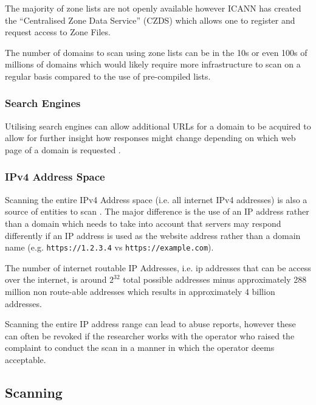\documentclass{mscreport}
\begin{document}
\vspace{0.3cm} \noindent
The majority of zone lists are not openly available however ICANN has created the ``Centralised Zone Data Service'' (CZDS) \cite{noauthor_undated-mm} which allows one to register and request access to Zone Files.

\vspace{0.3cm} \noindent
The number of domains to scan using zone lists can be in the 10s or even 100s of millions of domains which would likely require more infrastructure to scan on a regular basis compared to the use of pre-compiled lists.

\subsubsection{Search Engines}

Utilising search engines can allow additional URLs for a domain to be acquired to allow for further insight how responses might change depending on which web page of a domain is requested \cite{Chen2016-dl}.

\subsubsection{IPv4 Address Space}

Scanning the entire IPv4 Address space (i.e. all internet  IPv4 addresses) is also a source of entities to scan \cite{Kotzias2018-wd}. The major difference is the use of an IP address rather than a domain which needs to take into account that servers may respond differently if an IP address is used as the website address rather than a domain name (e.g. \texttt{https://1.2.3.4} vs \texttt{https://example.com}).

\vspace{0.3cm} \noindent
The number of internet routable IP Addresses, i.e. ip addresses that can be access over the internet, is around \(2^{32}\) total possible addresses minus approximately 288 million non route-able addresses which results in approximately 4 billion addresses.

\vspace{0.3cm} \noindent
Scanning the entire IP address range can lead to abuse reports, however these can often be revoked if the researcher works with the operator who raised the complaint to conduct the scan in a manner in which the operator deems acceptable.

\subsection{Scanning}
\end{document}
